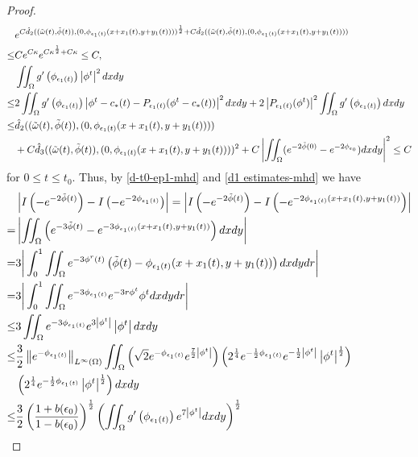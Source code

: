 \documentclass[1 [leqno, 11pt]{amsart}
\numberwithin{equation}{section}
\let\ep=\epsilon
\begin{document}
\begin{CJK*}{GBK}{song}
\begin{proof}
\begin{align*}
&e^{C\hat d_2((\tilde \omega(t),\tilde \phi(t)),( 0, \phi_{\ep_1(t)}(x+x_1(t),y+y_1(t))))^{1\over2}+C\hat d_2((\tilde \omega(t),\tilde \phi(t)),( 0, \phi_{\ep_1(t)}(x+x_1(t),y+y_1(t))))}\\
\leq &Ce^{C\kappa}e^{C\kappa^{1\over2}+C\kappa}\leq C,\\
&\iint_{\Omega}g'\left(\phi_{\ep_1(t)}\right)\left|\phi^t\right|^2dxdy\\
\leq&2\iint_{\Omega}g'\left(\phi_{\ep_1(t)}\right)\left|\phi^t-c_*(t)-P_{\ep_1(t)}(\phi^t-c_*(t))\right|^2dxdy+2\left|P_{\ep_1(t)}(\phi^t)\right|^2\iint_{\Omega}g'\left(\phi_{\ep_1(t)}\right)dxdy\\
\leq &\hat d_2((\tilde \omega(t),\tilde \phi(t)),( 0, \phi_{\ep_1(t)}(x+x_1(t),y+y_1(t))))\\
&+C\hat d_3((\tilde \omega(t),\tilde \phi(t)),( 0, \phi_{\ep_1(t)}(x+x_1(t),y+y_1(t))))^2+C\left|\iint_{\Omega}(e^{-2\tilde \phi(0)}-e^{-2\phi_{\ep_0}})dxdy\right|^2\leq C
\end{align*}
for $0\leq t\leq t_0$. Thus, by  \eqref{d-t0-ep1-mhd} and \eqref{d1 estimates-mhd}  we have
\begin{align}\nonumber
&\left|I\left(-e^{-2\tilde \phi(t)}\right)-I\left(-e^{-2\phi_{\ep_1(t)}}\right)\right|=\left|I\left(-e^{-2\tilde \phi(t)}\right)-I\left(-e^{-2\phi_{\ep_1(t)}(x+x_1(t),y+y_1(t))}\right)\right|\\\nonumber
=&\left|\iint_\Omega\left(e^{-3\tilde \phi(t)}-e^{-3\phi_{\ep_1(t)}(x+x_1(t),y+y_1(t))}\right)dxdy\right|\\\nonumber
=&3\bigg|\int_0^1\iint_\Omega e^{-3\phi^r(t)}\left(\tilde\phi(t)- \phi_{\ep_1(t)}(x+x_1(t),y+y_1(t)) \right)dxdydr\bigg|\\\nonumber
=&3\bigg|\int_0^1\iint_\Omega e^{-3\phi_{\ep_1(t)}}
e^{-3r\phi^t}\phi^t dxdydr\bigg|\\\nonumber
\leq&3\iint_\Omega e^{-3\phi_{\ep_1(t)}}
e^{3\left|\phi^t\right|}
\left|\phi^t \right|dxdy\\\nonumber
\leq&{3\over2}\left\|e^{-\phi_{\ep_1(t)}}\right\|_{L^\infty(\Omega)}
\iint_\Omega\left(\sqrt{2}e^{-\phi_{\ep_1(t)}}e^{{7\over2}\left|\phi^t\right|}\right)
\left(2^{1\over4}e^{-{1\over2}\phi_{\ep_1(t)}}e^{-{1\over2}\left|\phi^t\right|}\left|\phi^t\right|^{1\over2}\right)\\\nonumber
&\left(2^{1\over4}e^{-{1\over2}\phi_{\ep_1(t)}}\left|\phi^t\right|^{1\over2}\right)dxdy\\\nonumber
\leq &{3\over2}\left({1+b(\ep_0)\over1-b(\ep_0)}\right)^{1\over2}\left(\iint_{\Omega}g'\left(\phi_{\ep_1(t)}\right)e^{7\left|\phi^t\right|}dxdy\right)^{1\over2}

\end{align}
\end{proof}
\end{CJK*}
\end{document}
